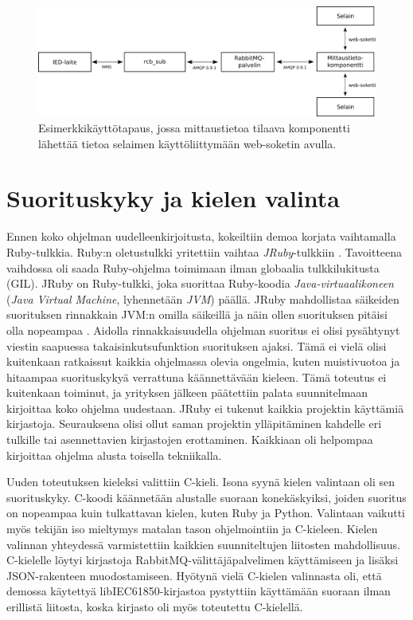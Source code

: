 \begin{figure}[ht!]
	\includegraphics[width=1\textwidth]{pictures/example-use-case.png}
	\caption{Esimerkkikäyttötapaus, jossa mittaustietoa tilaava komponentti lähettää tietoa selaimen käyttöliittymään web-soketin avulla.}
	\label{fig:example-use-case}
\end{figure}


\section{Suorituskyky ja kielen valinta}
Ennen koko ohjelman uudelleenkirjoitusta, kokeiltiin demoa korjata vaihtamalla Ruby-tulkkia. Ruby:n oletustulkki yritettiin vaihtaa \emph{JRuby}-tulkkiin \cite{jruby-homepage}. Tavoitteena vaihdossa oli saada Ruby-ohjelma toimimaan ilman globaalia tulkkilukitusta (GIL). JRuby on Ruby-tulkki, joka suorittaa Ruby-koodia \emph{Java-virtuaalikoneen} (\emph{Java Virtual Machine}, lyhennetään \emph{JVM}) päällä. JRuby mahdollistaa säikeiden suorituksen rinnakkain JVM:n omilla säikeillä ja näin ollen suorituksen pitäisi olla nopeampaa \mbox{\cite{Youssef2013}}. Aidolla rinnakkaisuudella ohjelman suoritus ei olisi pysähtynyt viestin saapuessa takaisinkutsufunktion suorituksen ajaksi. Tämä ei vielä olisi kuitenkaan ratkaissut kaikkia ohjelmassa olevia ongelmia, kuten muistivuotoa ja hitaampaa suorituskykyä verrattuna käännettävään kieleen. Tämä toteutus ei kuitenkaan toiminut, ja yrityksen jälkeen päätettiin palata suunnitelmaan kirjoittaa koko ohjelma uudestaan. JRuby ei tukenut kaikkia projektin käyttämiä kirjastoja. Seurauksena olisi ollut saman projektin ylläpitäminen kahdelle eri tulkille tai asennettavien kirjastojen erottaminen. Kaikkiaan oli helpompaa kirjoittaa ohjelma alusta toisella tekniikalla.

Uuden toteutuksen kieleksi valittiin C-kieli. Isona syynä kielen valintaan oli sen suorituskyky. C-koodi käännetään alustalle suoraan konekäskyiksi, joiden suoritus on nopeampaa kuin tulkattavan kielen, kuten Ruby ja Python. Valintaan vaikutti myös tekijän iso mieltymys matalan tason ohjelmointiin ja C-kieleen. Kielen valinnan yhteydessä varmistettiin kaikkien suunniteltujen liitosten mahdollisuus. C-kielelle löytyi kirjastoja RabbitMQ-välittäjäpalvelimen käyttämiseen ja lisäksi JSON-rakenteen muodostamiseen. Hyötynä vielä C-kielen valinnasta oli, että demossa käytettyä libIEC61850-kirjastoa pystyttiin käyttämään suoraan ilman erillistä liitosta, koska kirjasto oli myös toteutettu C-kielellä.


